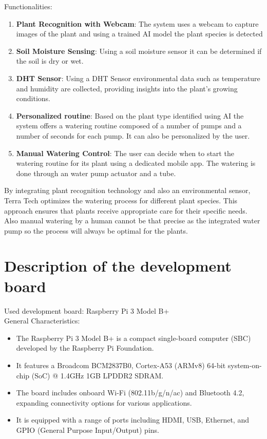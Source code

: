 \documentclass[12pt]{article}
\begin{document}
\hspace{1cm}Functionalities:
\begin{enumerate}[leftmargin=2cm]
\item \textbf{Plant Recognition with Webcam}: The system uses a webcam to capture images of the plant and using a trained AI model the plant species is detected
\item \textbf{Soil Moisture Sensing}: Using a soil moisture sensor it can be determined if the soil is dry or wet.
\item \textbf{DHT Sensor}: Using a DHT Sensor environmental data such as temperature and humidity are collected, providing insights into the plant’s growing conditions.
\item \textbf{Personalized routine}: Based on the plant type identified using AI the system offers a watering routine composed of a number of pumps and a number of seconds for each pump. It can also be personalized by the user.
\item \textbf{Manual Watering Control}: The user can decide when to start the watering routine for its plant using a dedicated mobile app. The watering is done through an water pump actuator and a tube.
\end{enumerate}

By integrating plant recognition technology and also an environmental sensor, Terra Tech optimizes the watering process for different plant species. This approach ensures that plants receive appropriate care for their specific needs. Also manual watering by a human cannot be that precise as the integrated water pump so the process will always be optimal for the plants.\\

\newpage 

\section{Description of the development board}

Used development board: Raspberry Pi 3 Model B+\\

\hspace{1cm}General Characteristics: 
\begin{itemize}[leftmargin=2cm]
    \item The Raspberry Pi 3 Model B+ is a compact single-board computer (SBC) developed by the Raspberry Pi Foundation.
    \item It features a Broadcom BCM2837B0, Cortex-A53 (ARMv8) 64-bit system-on-chip (SoC) @ 1.4GHz 1GB LPDDR2 SDRAM.
    \item The board includes onboard Wi-Fi (802.11b/g/n/ac) and Bluetooth 4.2, expanding connectivity options for various applications.
    \item It is equipped with a range of ports including HDMI, USB, Ethernet, and GPIO (General Purpose Input/Output) pins.
\end{itemize}
\end{document}
